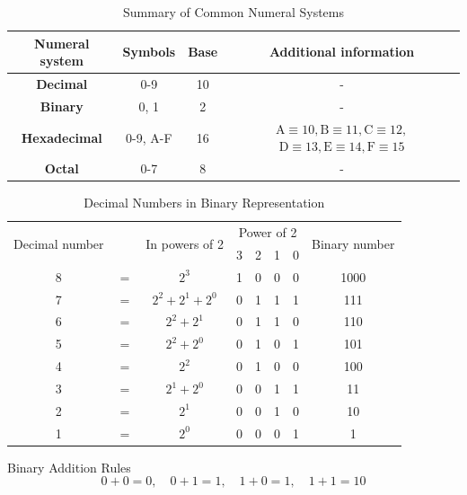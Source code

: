 
\begin{table}[ht]
\centering
\renewcommand{\arraystretch}{1.4}
\begin{tabular}{|c|c|c|c|}
\hline
\textbf{Numeral system} & \textbf{Symbols} & \textbf{Base} & \textbf{Additional information} \\ \hline
\textbf{Decimal} & 0-9 & 10 & - \\ \hline
\textbf{Binary} & 0, 1 & 2 & - \\ \hline
\textbf{Hexadecimal} & 0-9, A-F & 16 & $\mathrm{A} \equiv 10, \mathrm{B} \equiv 11, \mathrm{C} \equiv 12,$ $\mathrm{D} \equiv 13, \mathrm{E} \equiv 14, \mathrm{F} \equiv 15$ \\ \hline
\textbf{Octal} & 0-7 & 8 & - \\ \hline
\end{tabular}
\caption{Summary of Common Numeral Systems}
\end{table}

\begin{table}[!ht]
\centering
\renewcommand{\arraystretch}{1.4}
\begin{tabular}{|c c c c c c c c|}
\hline 
\multirow{2}{*}{Decimal number} & & \multirow{2}{*}{In powers of 2} & \multicolumn{4}{c}{Power of 2} & \multirow{2}{*}{Binary number} \\
& & & 3 & 2 & 1 & 0 & \\ \hline
8 & $=$ & $2^3$ & 1 & 0 & 0 & 0 & 1000 \\
7 & $=$ & $2^2 + 2^1 + 2^0$ & 0 & 1 & 1 & 1 & 111 \\
6 & $=$ & $2^2 + 2^1$ & 0 & 1 & 1 & 0 & 110 \\
5 & $=$ & $2^2 + 2^0$ & 0 & 1 & 0 & 1 & 101 \\
4 & $=$ & $2^2$ & 0 & 1 & 0 & 0 & 100 \\
3 & $=$ & $2^1 + 2^0$ & 0 & 0 & 1 & 1 & 11 \\
2 & $=$ & $2^1$ & 0 & 0 & 1 & 0 & 10 \\
1 & $=$ & $2^0$ & 0 & 0 & 0 & 1 & 1 \\ \hline
\end{tabular}
\caption{Decimal Numbers in Binary Representation}
\end{table}

\begin{proposition}{Binary Addition Rules}
\[
0 + 0 = 0, \quad 0 + 1 = 1, \quad 1 + 0 = 1, \quad 1 + 1 = 10
\]
\end{proposition}

